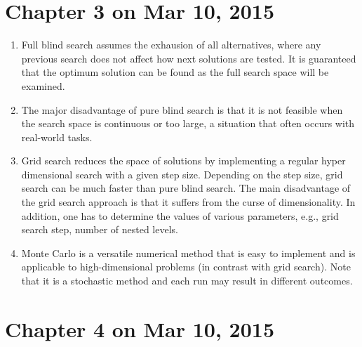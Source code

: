 \documentclass[12pt, a4paper]{article}
\begin{document}
\section{Chapter 3 on Mar 10, 2015}
\begin{enumerate}
\item Full blind search assumes the exhausion of all alternatives, where any previous search does not affect how next solutions are tested. It is guaranteed that the optimum solution can be found as the full search space will be examined. 

\item The major disadvantage of pure blind search is that it is not feasible when the search space is continuous or too large, a situation that often occurs with real-world tasks. 

\item Grid search reduces the space of solutions by implementing a regular hyper dimensional search with a given step size. Depending on the step size, grid search can be much faster than pure blind search. The main disadvantage of the grid search approach is that it suffers from the curse of dimensionality. In addition, one has to determine the values of various parameters, e.g., grid search step, number of nested levels. 

\item Monte Carlo is a versatile numerical method that is easy to implement and is applicable to high-dimensional problems (in contrast with grid search). Note that it is a stochastic method and each run may result in different outcomes.

\end{enumerate}

\section{Chapter 4 on Mar 10, 2015}
\end{document}
